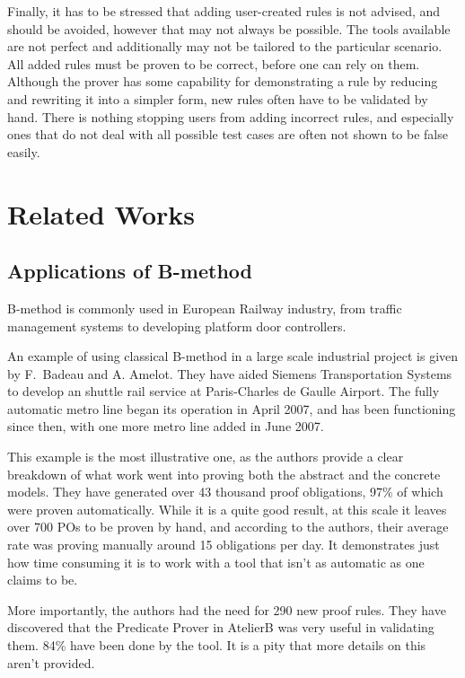 \documentclass[11pt,journal]{IEEEtran}
\begin{document}
	Finally, it has to be stressed that adding user-created rules is not advised, and should be avoided, however that may not always be possible. The tools available are not perfect and additionally may not be tailored to the particular scenario. All added rules must be proven to be correct, before one can rely on them. Although the prover has some capability for demonstrating a rule by reducing and rewriting it into a simpler form, new rules often have to be validated by hand. There is nothing stopping users from adding incorrect rules, and especially ones that do not deal with all possible test cases are often not shown to be false easily.
	
	\section{Related Works}
	
	\subsection{Applications of B-method}
	B-method is commonly used in European Railway industry, from traffic management systems to developing platform door controllers\cite{Door controller}.
	
	An example of using classical B-method in a large scale industrial project is given by F.~Badeau and A. Amelot\cite{airport shuttle}. They have aided Siemens Transportation Systems to develop an shuttle rail service at Paris-Charles de Gaulle Airport. The fully automatic metro line began its operation in April 2007, and has been functioning since then, with one more metro line added in June 2007.
	
	This example is the most illustrative one, as the authors provide a clear breakdown of what work went into proving both the abstract and the concrete models. They have generated over 43 thousand proof obligations, 97\% of which were proven automatically. While it is a quite good result, at this scale it leaves over 700 POs to be proven by hand, and according to the authors, their average rate was proving manually around 15 obligations per day. It demonstrates just how time consuming it is to work with a tool that isn't as automatic as one claims to be.
	
	More importantly, the authors had the need for 290 new proof rules. They have discovered that the Predicate Prover in AtelierB was very useful in validating them. 84\% have been done by the tool. It is a pity that more details on this aren't provided.
	
\end{document}
